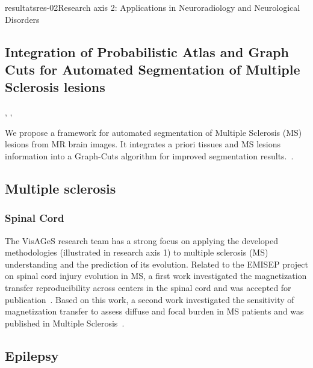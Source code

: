 \documentclass{ra2018}
\begin{document}
\begin{module}{resultats}{res-02}{Research axis 2: Applications in Neuroradiology and Neurological Disorders}
\subsection{Integration of Probabilistic Atlas and Graph Cuts for Automated Segmentation of Multiple Sclerosis lesions}
\begin{participants}
      ,
      ,
\end{participants}
We propose a framework for automated segmentation of Multiple Sclerosis (MS) lesions
from MR brain images. It integrates a priori tissues and MS lesions information into a Graph-Cuts algorithm for improved segmentation results.~\cite{galassi:hal-01823801}.

\subsection{Multiple sclerosis}

\subsubsection{Spinal Cord}
\begin{participants}
\end{participants}

The VisAGeS research team has a strong focus on applying the developed methodologies (illustrated in research axis 1) to multiple sclerosis (MS) understanding and the prediction of its evolution. Related to the EMISEP project on spinal cord injury evolution in MS, a first work investigated the magnetization transfer reproducibility across centers in the spinal cord and was accepted for publication~\cite{combes:hal-01934605}. Based on this work, a second work investigated the sensitivity of magnetization transfer to assess diffuse and focal burden in MS patients and was published in Multiple Sclerosis~\cite{combes:hal-01934621}.

\subsection{Epilepsy}
\begin{participants}
\end{participants}


\end{module}
\end{document}
